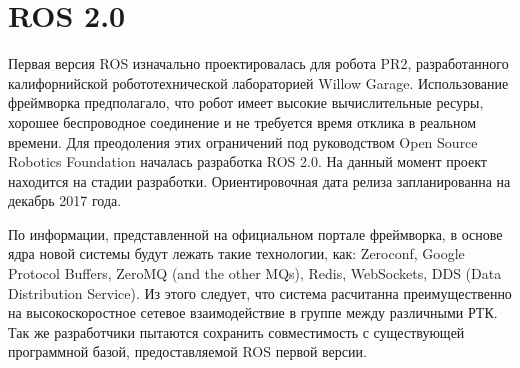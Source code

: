 \section{ROS 2.0}

Первая версия ROS изначально проектировалась для робота PR2, разработанного калифорнийской робототехнической лабораторией Willow Garage. Использование фреймворка предполагало, что робот имеет высокие вычислительные ресуры, хорошее беспроводное соединение и не требуется время отклика в реальном времени. Для преодоления этих ограничений под руководством Open Source Robotics Foundation началась разработка ROS 2.0. На данный момент проект находится на стадии разработки. Ориентировочная дата релиза запланированна на декабрь 2017 года.

По информации, представленной на официальном портале фреймворка, в основе ядра новой системы будут лежать такие технологии, как: Zeroconf, Google Protocol Buffers, ZeroMQ (and the other MQs), Redis, WebSockets, DDS (Data Distribution Service). Из этого следует, что система расчитанна преимущественно на высокоскоростное сетевое взаимодействие в группе между различными РТК. Так же разработчики пытаются сохранить совместимость с существующей программной базой, предоставляемой ROS первой версии.